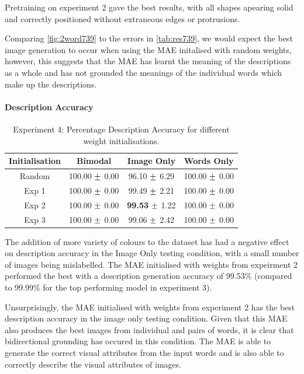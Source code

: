 Pretraining on experiment 2 gave the best results, with all shapes apearing solid and correctly positioned without extraneous edges or protrusions. 

Comparing \autoref{fig:2word739} to the errors in \autoref{tab:res739}, we would expect the best image generation to occur when using the MAE initalised with random weights, however, this suggests that the MAE has learnt the meaning of the descriptions as a whole and has not grounded the meanings of the individual words which make up the descriptions.

\paragraph{Description Accuracy}


\begin{table}[h!]
\centering
	\begin{tabular}{|c|c|c|c|}
	\hline
	\textbf{Initialisation} & 	\textbf{Bimodal} & 	\textbf{Image Only} 	& 	\textbf{Words Only} \\ \hline
Random 	&	100.00	$\mypm$	0.00	&	96.10	$\mypm$	6.29	&	100.00	$\mypm$	0.00	\\ \hline
Exp 1	&	100.00	$\mypm$	0.00	&	99.49	$\mypm$	2.21	&	100.00	$\mypm$	0.00	\\ \hline
Exp 2	&	100.00	$\mypm$	0.00	&	\textbf{99.53}	$\mypm$	1.22	&	100.00	$\mypm$	0.00\\ \hline
Exp 3	&	100.00	$\mypm$	0.00	&	99.06	$\mypm$	2.42	&	100.00	$\mypm$	0.00\\ \hline

	\end{tabular}
\caption{Experiment 4: Percentage Description Accuracy for different weight initialisations.}
\label{tab:res739acc}
\end{table}

The addition of more variety of colours to the dataset has had a negative effect on description accuracy in the Image Only testing condition, with a small number of images being mislabelled. The MAE initialised with weights from expeirment 2 performed the best with a description generation accuracy of 99.53\% (compared to 99.99\% for the top performing model in experiment 3).

Unsurprisingly, the MAE initialised with weights from experiment 2 has the best description accuracy in the image only testing condition. Given that this MAE also produces the best images from individual and pairs of words, it is clear that bidirectional grounding has occured in this condition. The MAE is able to generate the correct visual attributes from the input words and is also able to correctly describe the visual attributes of images.


